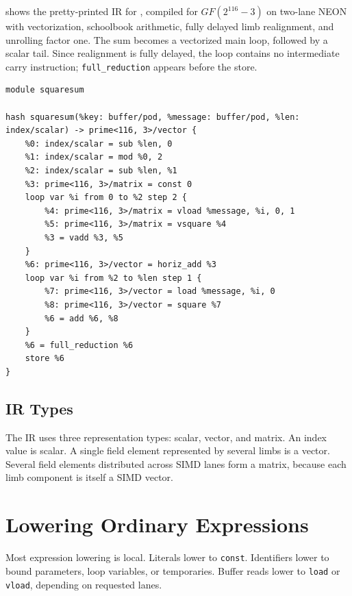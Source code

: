  shows the pretty-printed IR for , compiled for \(GF(2^{116}-3)\) on two-lane NEON with vectorization, schoolbook arithmetic, fully delayed limb realignment, and unrolling factor one. The sum becomes a vectorized main loop, followed by a scalar tail. Since realignment is fully delayed, the loop contains no intermediate carry instruction; \texttt{full\_reduction} appears before the store.

\begin{lstlisting}[style=thesisIR,caption={Pretty-printed IR for the vectorized square-sum running example in \(GF(2^{116}-3)\).},label={lst:squaresum-ir}]
module squaresum

hash squaresum(%key: buffer/pod, %message: buffer/pod, %len: index/scalar) -> prime<116, 3>/vector {
    %0: index/scalar = sub %len, 0
    %1: index/scalar = mod %0, 2
    %2: index/scalar = sub %len, %1
    %3: prime<116, 3>/matrix = const 0
    loop var %i from 0 to %2 step 2 {
        %4: prime<116, 3>/matrix = vload %message, %i, 0, 1
        %5: prime<116, 3>/matrix = vsquare %4
        %3 = vadd %3, %5
    }
    %6: prime<116, 3>/vector = horiz_add %3
    loop var %i from %2 to %len step 1 {
        %7: prime<116, 3>/vector = load %message, %i, 0
        %8: prime<116, 3>/vector = square %7
        %6 = add %6, %8
    }
    %6 = full_reduction %6
    store %6
}
\end{lstlisting}

\subsection{IR Types}
\label{subsec:ir-types}

The IR uses three representation types: scalar, vector, and matrix. An index value is scalar. A single field element represented by several limbs is a vector. Several field elements distributed across SIMD lanes form a matrix, because each limb component is itself a SIMD vector.

\section{Lowering Ordinary Expressions}
\label{sec:lowering-expressions}

Most expression lowering is local. Literals lower to \texttt{const}. Identifiers lower to bound parameters, loop variables, or temporaries. Buffer reads lower to \texttt{load} or \texttt{vload}, depending on requested lanes.


